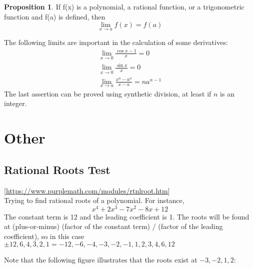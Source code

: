 \documentclass[a4paper,twoside=off]{scrbook}
\theoremstyle{definition}
\newtheorem{proposition}{Proposition}[section]
\begin{document}
\begin{proposition}
    If f(x) is a polynomial, a rational function, or a trigonometric function and f(a) is defined, then
    \begin{equation}
        \lim\limits_{x \to a}f(x) = f(a)
    \end{equation}
\end{proposition}

\medskip

The following limits are important in the calculation of some derivatives:
\begin{equation}
    \begin{gathered}
        \lim\limits_{x \to 0} \frac{\cos x - 1}{x} = 0 \\
        \lim\limits_{x \to 0} \frac{\sin x}{x} = 0 \\
        \lim\limits_{x \to a} \frac{x^{n} - a^{n}}{x - a} = na^{n-1}
    \end{gathered}
\end{equation}
The last assertion can be proved using synthetic division, at least if $n$ is an integer.



\chapter{Other}
\section{Rational Roots Test}
[\url{https://www.purplemath.com/modules/rtnlroot.htm}] \\
Trying to find rational roots of a polynomial.  For instance,
\begin{equation}
    x^{4} + 2x^{3} - 7x^{2} - 8x + 12
\end{equation}
The constant term is 12 and the leading coefficient is 1.  The roots will be found at
(plus-or-minus) (factor of the constant term) / (factor of the leading coefficient), so in this case $\pm 12, 6, 4, 3, 2, 1 = -12, -6, -4, -3, -2, -1, 1, 2, 3, 4, 6, 12$

Note that the following figure illustrates that the roots exist at $-3, -2, 1, 2$:

\end{document}

